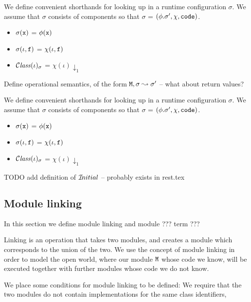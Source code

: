 \begin{definition}
We define convenient shorthands for looking up in a runtime configuration $\sigma$. We assume that
$\sigma$ consists of components so that $\sigma$ = $(\phi.\sigma', \chi, {\mbox{\tt{code}}} )$.
\begin{itemize}
\item 
$\sigma({\mbox{\tt{x}}})$ = $\phi({\mbox{\tt{x}}})$ 
\item
$\sigma(\iota, {\mbox{\tt{f}}})$ = $\chi(\iota,{\mbox{\tt{f}}})$ 
\item
${\mathcal C}{\mathit{lass}}(\iota)_{\sigma} $ = $\chi(\iota)\downarrow_1$
\end{itemize}

\end{definition}



Define operational semantics, of the form ${\mbox{\tt{M}}}, \sigma \leadsto \sigma'$ -- what about return values?

\begin{definition}
We define convenient shorthands for looking up in a runtime configuration $\sigma$. We assume that
$\sigma$ consists of components so that $\sigma$ = $(\phi.\sigma', \chi, {\mbox{\tt{code}}} )$.
\begin{itemize}
\item 
$\sigma({\mbox{\tt{x}}})$ = $\phi({\mbox{\tt{x}}})$ 
\item
$\sigma(\iota, {\mbox{\tt{f}}})$ = $\chi(\iota,{\mbox{\tt{f}}})$ 
\item
${\mathcal C}{\mathit{lass}}(\iota)_{\sigma} $ = $\chi(\iota)\downarrow_1$
\end{itemize}

\end{definition}

TODO add definition of  ${{\mathcal I}\!nitial}$ -- probably exists in rest.tex

\subsection{Module linking}

 In this section we define  module linking and module ??? term ???
 
 Linking is an operation that takes two modules, and creates a module which corresponds  to the union of the two. We use the concept of module linking in order to model the open world, where our module ${\mbox{\tt{M}}}$ whose code we know, will be executed together with further modules whose code we do not know. 

We place some conditions for module linking to be defined: We require that the two modules do not contain implementations for the same class identifiers,  

